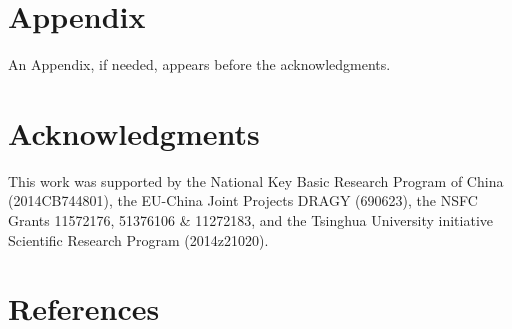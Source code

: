 \documentclass{AIAA}
\begin{document}
\section*{Appendix}

An Appendix, if needed, appears before the acknowledgments.


\clearpage %
\section*{Acknowledgments}
This work was supported by the National Key Basic Research Program of China (2014CB744801), the EU-China Joint Projects DRAGY (690623), the NSFC Grants 11572176, 51376106 \& 11272183, and the Tsinghua University initiative Scientific Research Program (2014z21020).

\section*{References}


\end{document}
